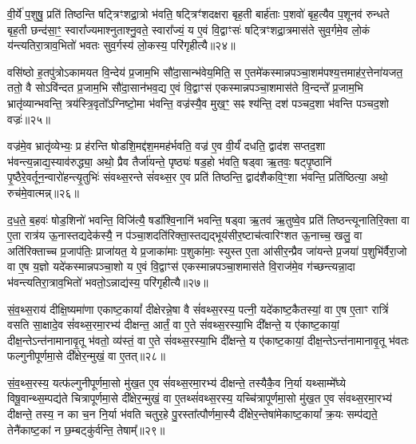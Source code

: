वी॒र्ये॑ प॒शुषु॒ प्रति॑ तिष्ठन्ति षट्त्रिꣳशद्रा॒त्रो भ॑वति॒ षट्त्रिꣳ॑शदक्षरा बृह॒ती बार्\mbox{}ह॑ताः प॒शवो॑ बृह॒त्यैव प॒शूनव॑ रुन्धते बृह॒ती छन्द॑सा॒ꣳ॒ स्वारा᳚ज्यमाश्नुताश्नु॒वते॒ स्वारा᳚ज्यं॒ य ए॒वं वि॒द्वाꣳसः॑ षट्त्रिꣳशद्रा॒त्रमास॑ते सुव॒र्गमे॒व लो॒कं य॑न्त्यतिरा॒त्राव॒भितो॑ भवतः सुव॒र्गस्य॑ लो॒कस्य॒ परि॑गृहीत्यै॥२४॥

{\anuvakamend[{अ॒ति॒रा॒त्र ओज॑स्ये॒व षट्त्रिꣳ॑शच्च॥६॥}]}

वसि॑ष्ठो ह॒तपु॑त्रो\-ऽकामयत वि॒न्देय॑ प्र॒जाम॒भि सौ॑दा॒सान्भ॑वेय॒मिति॒ स ए॒तमे॑कस्मान्नपञ्चा॒शम॑पश्य॒त्तमाह॑र॒त्तेना॑यजत॒ ततो॒ वै सो\-ऽवि॑न्दत प्र॒जाम॒भि सौ॑दा॒सान॑भव॒द्य ए॒वं वि॒द्वाꣳस॑ एकस्मान्नपञ्चा॒शमास॑ते वि॒न्दन्ते᳚ प्र॒जाम॒भि भ्रातृ॑व्यान्भवन्ति॒ त्रय॑स्त्रि॒वृतो᳚\-ऽग्निष्टो॒मा भ॑वन्ति॒ वज्र॑स्यै॒व मुख॒ꣳ॒ सꣴ श्य॑न्ति॒ दश॑ पञ्चद॒शा भ॑वन्ति पञ्चद॒शो वज्रः॑॥२५॥

वज्र॑मे॒व भ्रातृ॑व्येभ्यः॒ प्र ह॑रन्ति षोडशि॒मद्द॑श॒ममह॑र्भवति॒ वज्र॑ ए॒व वी॒र्यं॑ दधति॒ द्वाद॑श सप्तद॒शा भ॑वन्त्य॒न्नाद्य॒स्याव॑रुद्ध्या॒ अथो॒ प्रैव तैर्जा॑यन्ते॒ पृष्ठ्यः॑ षड॒हो भ॑वति॒ षड्वा ऋ॒तवः॒ षट्पृ॒ष्ठानि॑ पृ॒ष्ठैरे॒वर्तून॒न्वारो॑हन्त्यृ॒तुभिः॑ संवथ्स॒रन्ते सं॑वथ्स॒र ए॒व प्रति॑ तिष्ठन्ति॒ द्वाद॑शैकवि॒ꣳ॒शा भ॑वन्ति॒ प्रति॑ष्ठित्या॒ अथो॒ रुच॑मे॒वात्मन्न्॥२६॥

द॒ध॒ते॒ ब॒हवः॑ षोड॒शिनो॑ भवन्ति॒ विजि॑त्यै॒ षडा᳚श्वि॒नानि॑ भवन्ति॒ षड्वा ऋ॒तव॑ ऋ॒तुष्वे॒व प्रति॑ तिष्ठन्त्यूनातिरि॒क्ता वा ए॒ता रात्र॑य ऊ॒नास्तद्यदेक॑स्यै॒ न प॑ञ्चा॒शदति॑रिक्ता॒स्तद्यद्भूय॑सीर॒ष्टाच॑त्वारिꣳशत ऊ॒नाच्च॒ खलु॒ वा अति॑रिक्ताच्च प्र॒जाप॑तिः॒ प्राजा॑यत॒ ये प्र॒जाका॑माः प॒शुका॑माः॒ स्युस्त ए॒ता आ॑सीर॒न्प्रैव जा॑यन्ते प्र॒जया॑ प॒शुभि॑र्वैरा॒जो वा ए॒ष य॒ज्ञो यदे॑कस्मान्नपञ्चा॒शो य ए॒वं वि॒द्वाꣳस॑ एकस्मान्नपञ्चा॒शमास॑ते वि॒राज॑मे॒व ग॑च्छन्त्यन्ना॒दा भ॑वन्त्यतिरा॒त्राव॒भितो॑ भवतो॒\-ऽन्नाद्य॑स्य॒ परि॑गृहीत्यै॥२७॥

{\anuvakamend[{वज्र॑ आ॒त्मन्प्र॒जया॒ द्वाविꣳ॑शतिश्च॥७॥}]}

सं॒व॒थ्स॒राय॑ दीक्षि॒ष्यमा॑णा एकाष्ट॒कायां᳚ दीक्षेरन्ने॒षा वै सं॑वथ्स॒रस्य॒ पत्नी॒ यदे॑काष्ट॒कैतस्यां॒ वा ए॒ष ए॒ताꣳ रात्रिं॑ वसति सा॒क्षादे॒व सं॑वथ्स॒रमा॒रभ्य॑ दीक्षन्त॒ आर्तं॒ वा ए॒ते सं॑वथ्स॒रस्या॒भि दी᳚क्षन्ते॒ य ए॑काष्ट॒कायां॒ दीक्ष॒न्ते\-ऽन्त॑नामानावृ॒तू भ॑वतो॒ व्य॑स्तं॒ वा ए॒ते सं॑वथ्स॒रस्या॒भि दी᳚क्षन्ते॒ य ए॑काष्ट॒कायां॒ दीक्ष॒न्ते\-ऽन्त॑नामानावृ॒तू भ॑वतः फल्गुनीपूर्णमा॒से दी᳚क्षेर॒न्मुखं॒ वा ए॒तत्॥२८॥

सं॒व॒थ्स॒रस्य॒ यत्फ॑ल्गुनीपूर्णमा॒सो मु॑ख॒त ए॒व सं॑वथ्स॒रमा॒रभ्य॑ दीक्षन्ते॒ तस्यैकै॒व नि॒र्या यथ्साम्मे᳚घ्ये विषू॒वान्थ्स॒म्पद्य॑ते चित्रापूर्णमा॒से दी᳚क्षेर॒न्मुखं॒ वा ए॒तथ्सं॑वथ्स॒रस्य॒ यच्चि॑त्रापूर्णमा॒सो मु॑ख॒त ए॒व सं॑वथ्स॒रमा॒रभ्य॑ दीक्षन्ते॒ तस्य॒ न का च॒न नि॒र्या भ॑वति चतुर॒हे पु॒रस्ता᳚त्पौर्णमा॒स्यै दी᳚क्षेर॒न्तेषा॑मेकाष्ट॒कायां᳚ क्र॒यः सम्प॑द्यते॒ तेनै॑काष्ट॒कां न छ॒म्बट्कु॑र्वन्ति॒ तेषाम्᳚॥२९॥

